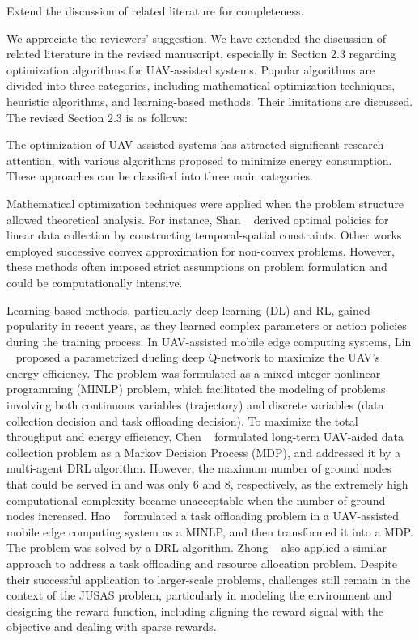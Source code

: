 \begin{metacomment}
	Extend the discussion of related literature for completeness.
\end{metacomment}
\begin{metaresponse}%
	We appreciate the reviewers' suggestion.
	We have extended the discussion of related literature in the revised manuscript, especially in Section 2.3 regarding optimization algorithms for UAV-assisted systems.
	Popular algorithms are divided into three categories, including mathematical optimization techniques, heuristic algorithms, and learning-based methods. Their limitations are discussed.
	The revised Section 2.3 is as follows:
	\begin{changes}
		The optimization of UAV-assisted systems has attracted significant research attention, with various algorithms proposed to minimize energy consumption. 
		These approaches can be classified into three main categories.

		Mathematical optimization techniques were applied when the problem structure allowed theoretical analysis. 
		For instance, Shan \etal~\cite{SLXWL-INFOCOM20} derived optimal policies for linear data collection by constructing temporal-spatial constraints. 
		Other works~\cite{b-math1,b-math2} employed successive convex approximation for non-convex problems. 
		However, these methods often imposed strict assumptions on problem formulation and could be computationally intensive.

		Learning-based methods, particularly deep learning (DL) and RL, gained popularity in recent years, as they learned complex parameters or action policies during the training process.
		In UAV-assisted mobile edge computing systems, Lin \etal~\cite{b-DL} proposed a parametrized dueling deep Q-network to maximize the UAV's energy efficiency.
		The problem was formulated as a mixed-integer nonlinear programming (MINLP) problem, which facilitated the modeling of problems involving both continuous variables (\eg trajectory) and discrete variables (\eg data collection decision and task offloading decision).
		To maximize the total throughput and energy efficiency, Chen \etal~\cite{b-RL} formulated long-term UAV-aided data collection problem as a Markov Decision Process (MDP), and addressed it by a multi-agent DRL algorithm.
		However, the maximum number of ground nodes that could be served in \cite{b-DL} and \cite{b-RL} was only 6 and 8, respectively, as the extremely high computational complexity became unacceptable when the number of ground nodes increased.
		Hao \etal~\cite{hao-minlp} formulated a task offloading problem in a UAV-assisted mobile edge computing system as a MINLP, and then transformed it into a MDP.
		The problem was solved by a DRL algorithm.
		Zhong \etal~\cite{zhong-minlp} also applied a similar approach to address a task offloading and resource allocation problem.
		Despite their successful application to larger-scale problems, challenges still remain in the context of the JUSAS problem, particularly in modeling the environment and designing the reward function, including aligning the reward signal with the objective and dealing with sparse rewards.


\end{changes}
\end{metaresponse}

